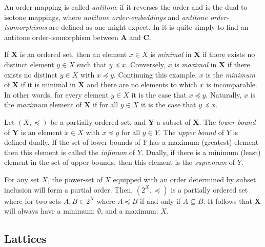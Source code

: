 An order-mapping is called \textit{antitone} if it reverses the order and is the dual to isotone mappings, where \textit{antitone order-embeddings} and \textit{antitone order-isomorphisms} are defined as one might expect. In  it is quite simply to find an antitone order-isomorphism between $\mathbf{A}$ and $\mathbf{C}$. 

If $\mathbf{X}$ is an ordered set, then an element $x \in X$ is \textit{minimal} in $\mathbf{X}$ if there exists no distinct element $y \in X$ such that $y \preceq x$. Conversely, $x$ is \textit{maximal} in $\mathbf{X}$ if there exists no distinct $y \in X$ with $x \preceq y$. Continuing this example, $x$ is the \textit{minimum} of $\mathbf{X}$ if it is minimal in $\mathbf{X}$ and there are no elements to which $x$ is incomparable. In other words, for every element $y \in X$ it is the case that $x \preceq y$. Naturally, $x$ is the \textit{maximum} element of $\mathbf{X}$ if for all $y \in X$ it is the case that $y \preceq x$.

\begin{definition}
  \label{definition:infimum-supremum}
  Let $(X,\preceq)$ be a partially ordered set, and $\mathbf{Y}$ a subset of $\mathbf{X}$. The \textit{lower bound} of $\mathbf{Y}$ is an element $x \in X$ with $x \preceq y$ for all $y \in Y$. The \textit{upper bound} of $Y$ is defined dually. If the set of lower bounds of $Y$ has a maximum (greatest) element then this element is called the \textit{infimum} of $Y$. Dually, if there is a minimum (least) element in the set of upper bounds, then this element is the \textit{supremum} of $Y$.
   
\end{definition}

\begin{remark}
  \label{remark:natural-order-subset-inclusion}
  For any set $X$, the power-set of $X$ equipped with an order determined by subset inclusion will form a partial order. Then, $(2^X, \preceq)$ is a partially ordered set where for two sets $A, B \in 2^X$ where $A \preceq B$ if and only if $A \subseteq B$. It follows that $\mathbf{X}$ will always have a minimum: $\emptyset$, and a maximum: $X$.
\end{remark}

\subsection{Lattices}
\label{subsection:lattices}


